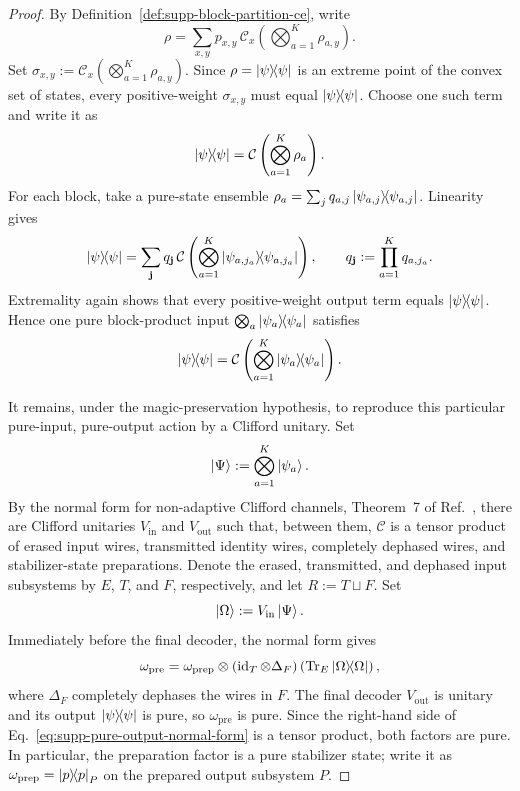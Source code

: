 \documentclass[
  aps,
  prx,
  reprint,
  superscriptaddress,
  amsmath,
  amssymb,
  nofootinbib,
  longbibliography
]{revtex4-2}
\newcommand{\map}[1]{\mathcal{#1}}
\begin{document}
\begin{proof}
By Definition~\ref{def:supp-block-partition-ce}, write
\begin{equation}
\rho
=
\sum_{x,y}p_{x,y}\,
\map C_x
\left(
\bigotimes_{a=1}^{K}\rho_{a,y}
\right).
\end{equation}
Set
$\sigma_{x,y}:=\map C_x(\bigotimes_{a=1}^{K}\rho_{a,y})$.  Since
$\rho=\dyad{\psi}$ is an extreme point of the convex set of states, every
positive-weight $\sigma_{x,y}$ must equal $\dyad{\psi}$.  Choose one such
term and write it as
\begin{equation}
\dyad{\psi}
=
\map C
\left(
\bigotimes_{a=1}^{K}\rho_a
\right).
\end{equation}
For each block, take a pure-state ensemble
$\rho_a=\sum_j q_{a,j}\dyad{\psi_{a,j}}$.  Linearity gives
\begin{equation}
\dyad{\psi}
=
\sum_{\mathbf j}q_{\mathbf j}\,
\map C
\left(
\bigotimes_{a=1}^{K}\dyad{\psi_{a,j_a}}
\right),
\qquad
q_{\mathbf j}:=\prod_{a=1}^{K}q_{a,j_a}.
\end{equation}
Extremality again shows that every positive-weight output term equals
$\dyad{\psi}$.  Hence one pure block-product input
$\bigotimes_a\dyad{\psi_a}$ satisfies
\begin{equation}
\dyad{\psi}
=
\map C
\left(
\bigotimes_{a=1}^{K}\dyad{\psi_a}
\right).
\end{equation}

It remains, under the magic-preservation hypothesis, to reproduce this
particular pure-input, pure-output action by a Clifford unitary.  Set
\begin{equation}
\ket{\Psi}:=\bigotimes_{a=1}^{K}\ket{\psi_a}.
\end{equation}
By the normal form for non-adaptive Clifford channels, Theorem~7 of
Ref.~\cite{yashin2025characterization}, there are Clifford unitaries
$V_{\mathrm{in}}$ and $V_{\mathrm{out}}$ such that, between them, $\map C$
is a tensor product of erased input wires, transmitted identity wires,
completely dephased wires, and stabilizer-state preparations.  Denote the
erased, transmitted, and dephased input subsystems by $E$, $T$, and $F$,
respectively, and let $R:=T\sqcup F$.  Set
\begin{equation}
\ket{\Omega}
:=V_{\mathrm{in}}\ket{\Psi}.
\end{equation}
Immediately before the final decoder, the normal form gives
\begin{equation}
\omega_{\mathrm{pre}}
=\omega_{\mathrm{prep}}\otimes
(\operatorname{id}_T\otimes\Delta_F)
\left(\Tr_E\dyad{\Omega}\right),
\label{eq:supp-pure-output-normal-form}
\end{equation}
where $\Delta_F$ completely dephases the wires in $F$.  The final decoder
$V_{\mathrm{out}}$ is unitary and its output $\dyad{\psi}$ is pure, so
$\omega_{\mathrm{pre}}$ is pure.  Since the right-hand side of
Eq.~\eqref{eq:supp-pure-output-normal-form} is a tensor product, both factors
are pure.  In particular, the preparation factor is a pure stabilizer state;
write it as
$\omega_{\mathrm{prep}}=\dyad{p}_P$ on the prepared output subsystem $P$.


\end{proof}
\end{document}
